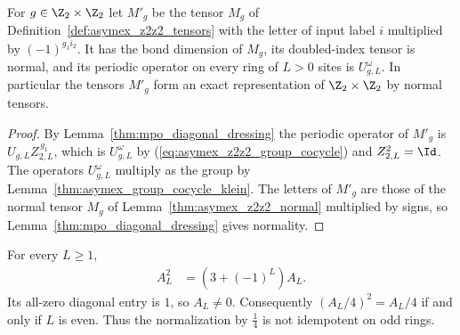 \begin{lemma}%
    \label{thm:asymex_z2z2_exact}
    \leanok
    For $g\in\Z_2\times\Z_2$ let $M'_g$ be the tensor $M_g$ of
    Definition~\ref{def:asymex_z2z2_tensors} with the letter of input label
    $i$ multiplied by $(-1)^{g_1i_2}$. It has the bond dimension of $M_g$,
    its doubled-index tensor is normal, and its periodic operator on every
    ring of $L>0$ sites is $U^{\omega}_{g,L}$. In particular the tensors
    $M'_g$ form an exact representation of $\Z_2\times\Z_2$ by normal
    tensors.
\end{lemma}

\begin{proof}
    \leanok
    By Lemma~\ref{thm:mpo_diagonal_dressing} the periodic operator
    of $M'_g$ is $U_{g,L}Z_{2,L}^{\,g_1}$, which is $U^{\omega}_{g,L}$ by
    (\ref{eq:asymex_z2z2_group_cocycle}) and $Z_{2,L}^2=\Id$. The
    operators $U^{\omega}_{g,L}$ multiply as the group by
    Lemma~\ref{thm:asymex_group_cocycle_klein}. The letters of $M'_g$
    are those of the normal tensor $M_g$ of
    Lemma~\ref{thm:asymex_z2z2_normal} multiplied by signs, so
    Lemma~\ref{thm:mpo_diagonal_dressing} gives normality.
\end{proof}

\begin{lemma}%
    \label{thm:asymex_z2z2_defect_sq}
    \leanok
    For every $L\geq1$,
    \begin{align}
        A_L^2 & =(3+(-1)^L)A_L.
        \label{eq:asymex_z2z2_defect_square}
    \end{align}
    Its all-zero diagonal entry is $1$, so $A_L\neq0$.
    Consequently $(A_L/4)^2=A_L/4$ if and only if $L$ is even.
    Thus the normalization by $\tfrac14$ is not idempotent on odd
    rings.
\end{lemma}

